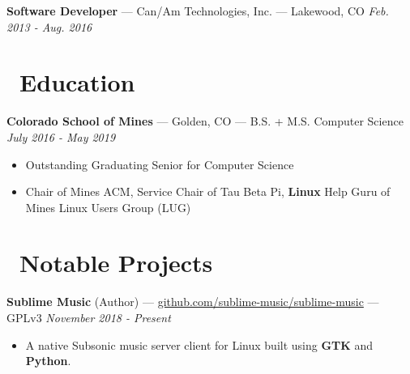 \documentclass[10pt,letterpaper]{article}
\begin{document}



\vspace{2pt}
{\fontsize{11}{0}
\textbf{Software Developer} --- Can/Am Technologies, Inc. --- Lakewood, CO}
\hfill \textit{Feb. 2013 - Aug. 2016}

\section*{\faBook\ Education}
{\fontsize{11}{0}
\textbf{Colorado School of Mines} --- Golden, CO --- B.S. + M.S. Computer Science}
\hfill \textit{July 2016 - May 2019}
\begin{itemize}
    \item Outstanding Graduating Senior for Computer Science
    \item Chair of Mines ACM, Service Chair of Tau Beta Pi, \textbf{Linux} Help
        Guru of Mines Linux Users Group (LUG)
\end{itemize}

\section*{\faCode\ Notable Projects}
{\fontsize{11}{0}
\textbf{Sublime Music} (Author) ---
\href{https://github.com/sublime-music/sublime-music}{github.com/sublime-music/sublime-music} --- GPLv3}
\hfill \textit{November 2018 - Present}
\begin{itemize}
    \item A native Subsonic music server client for Linux built using
        \textbf{GTK} and \textbf{Python}.
\end{itemize}
\end{document}
